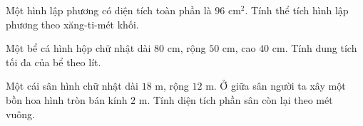 \begin{ex} %
Một hình lập phương có diện tích toàn phần là $96\text{ cm}^2$. Tính thể tích hình lập phương theo xăng-ti-mét khối.
\end{ex}

\begin{ex} %
Một bể cá hình hộp chữ nhật dài $80\text{ cm}$, rộng $50\text{ cm}$, cao $40\text{ cm}$. Tính dung tích tối đa của bể theo lít.
\end{ex}

\begin{ex} %
Một cái sân hình chữ nhật dài $18\text{ m}$, rộng $12\text{ m}$. Ở giữa sân người ta xây một bồn hoa hình tròn bán kính $2\text{ m}$. Tính diện tích phần sân còn lại theo mét vuông.
\end{ex}
